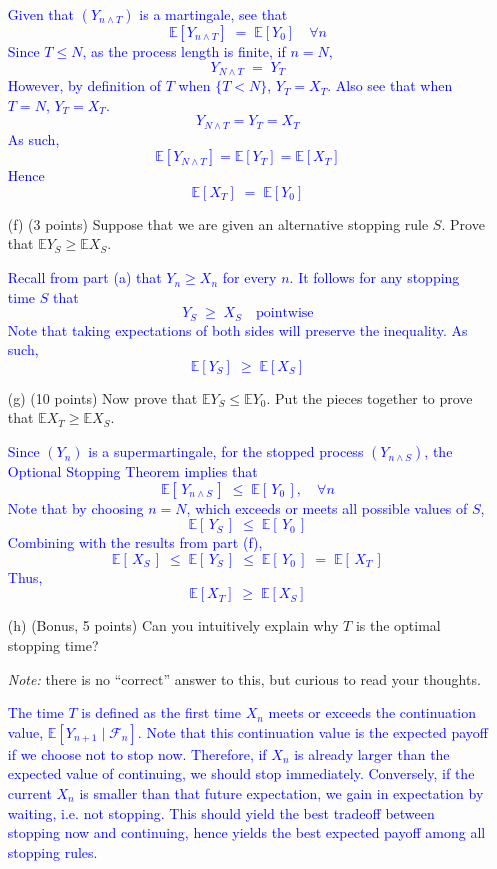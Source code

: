 \documentclass{article}
\begin{document}
\begin{enumerate}
        \textcolor{blue}{
            Given that $(Y_{n\wedge T})$ is a martingale, see that 
\[
\mathbb{E}[Y_{n\wedge T}] 
\;=\;
\mathbb{E}[Y_0] 
\quad
\forall n
\]
Since $T \le N$, as the process length is finite, if $n = N$,
\[
Y_{N\wedge T} \;=\; Y_T
\]
However, by definition of $T$ when $\{T < N\}$, $Y_T = X_T$. Also see that when $T=N$, $Y_T = X_T$. 
\[
Y_{N\wedge T} = Y_T = X_T
\]
As such,
\[
    \mathbb{E}[Y_{N\wedge T}] = \mathbb{E}[Y_T] = \mathbb{E}[X_T]
\]
Hence
\[
\mathbb{E}[X_T]
\;=\;
\mathbb{E}[Y_0]
\]
        }
    
    \item[(f)] (3 points) Suppose that we are given an alternative stopping rule $S$. Prove that $\mathbb{E}Y_S \geq \mathbb{E}X_S$.

    \textcolor{blue}{
        Recall from part (a) that $Y_n \ge X_n$ for every $n$. It follows for any stopping time $S$ that
\[
Y_S \;\ge\; X_S
\quad
\text{pointwise}
\]
Note that taking expectations of both sides will preserve the inequality. As such, 
\[
\mathbb{E}[Y_S]
\;\ge\;
\mathbb{E}[X_S]
\]
    }
    
    \item[(g)] (10 points) Now prove that $\mathbb{E}Y_S \leq \mathbb{E}Y_0$. Put the pieces together to prove that $\mathbb{E}X_T \geq \mathbb{E}X_S$.

        \textcolor{blue}{
            Since $(Y_n)$ is a supermartingale, for the stopped process $(Y_{n\wedge S})$, the Optional Stopping Theorem implies that 
\[
\mathbb{E}[\,Y_{n\wedge S}\,] \;\le\; \mathbb{E}[\,Y_0\,],
\quad
\forall n
\]
Note that by choosing $n=N$, which exceeds or meets all possible values of $S$,
\[
\mathbb{E}[\,Y_S\,]
\;\le\;
\mathbb{E}[\,Y_0\,]
\]
Combining with the results from part (f), 
\[
\mathbb{E}[\,X_S\,] \;\le\; \mathbb{E}[\,Y_S\,] \;\le\; \mathbb{E}[\,Y_0\,] \;=\; \mathbb{E}[\,X_T\,]
\]
Thus,
\[
\mathbb{E}[X_T]
\;\ge\;
\mathbb{E}[X_S]
\]
        }
    
    \item[(h)] (Bonus, 5 points) Can you intuitively explain why $T$ is the optimal stopping time?

    \textit{Note:} there is no ``correct'' answer to this, but curious to read your thoughts.

    \textcolor{blue}{ 
        The time $T$ is defined as the first time $X_n$
        meets or exceeds the continuation value, $\mathbb{E}[Y_{n+1}\mid
        \mathcal{F}_n]$. Note that this continuation value is the expected payoff
        if we choose not to stop now. Therefore, if $X_n$ is already
        larger than the expected value of continuing, we should stop
        immediately. Conversely, if the current $X_n$ is smaller than that
        future expectation, we gain in expectation by waiting, i.e. not stopping. This should yield
        the best tradeoff between stopping now and continuing, hence
        yields the best expected payoff among all stopping rules. }


\end{enumerate}
\end{document}
